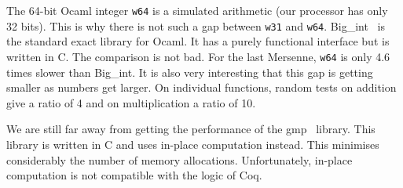 The 64-bit {\sc Ocaml} integer {\tt w64} is a simulated arithmetic 
(our processor has only 32 bits).
This is why there is not such a gap between {\tt w31} and {\tt w64}. 
{\sc Big\_int}~\cite{bignum} is the  standard exact library for {\sc Ocaml}. 
It has a purely functional interface but 
is written in C. The comparison is not bad. For the last Mersenne, {\tt w64}
is only 4.6 times slower than {\sc Big\_int}. 
It is also very interesting that this gap is getting smaller as numbers get larger. 
On individual functions, random tests on addition give a ratio of 4 and on multiplication a ratio of 10.

We are still far away from getting the performance of the {\sc gmp}~\cite{GMP}
library. This library is written in C and uses in-place computation instead. 
This minimises considerably the number of memory allocations.
Unfortunately, in-place computation is not compatible with 
the logic of {\sc Coq}.

